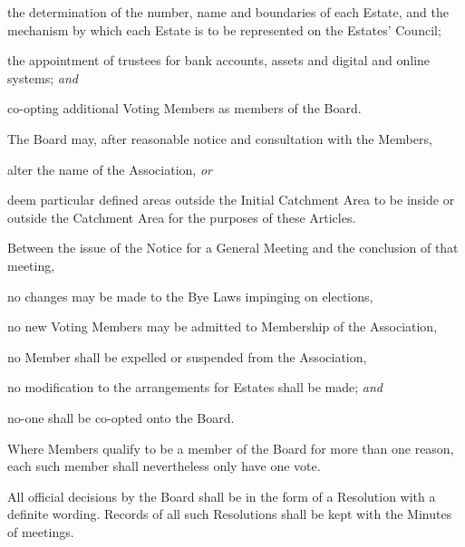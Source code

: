 \documentclass[12pt]{article}
\newcommand{\EC}[0]{Board}
\newcommand{\Exec}[0]{\EC{} }
\newcommand{\ITand}[0]{\textit{and}}
\newcommand{\ITor}[0]{\textit{or}}
\begin{document}
\begin{constenum}
\begin{constenum}
      \item the determination of the number, name
        and boundaries of each Estate, and the mechanism by which each Estate
        is to be represented on the Estates' Council;

      \item the appointment of trustees for bank accounts, assets and
        digital and online systems; \ITand

      \item co-opting additional Voting Members as members of the \EC{}.

    \end{constenum}

  \item The \Exec may, after reasonable notice and consultation with the
    Members,
    \begin{constenum}
    \item alter the name of the Association, \ITor
    \item deem particular defined areas outside the Initial Catchment Area
      to be inside or outside the Catchment Area
      for the purposes of these Articles.
    \end{constenum}

  \item Between the issue of the Notice for a General Meeting and
    the conclusion of that meeting,
    \begin{constenum}
      \item no changes may be made to the Bye Laws impinging on elections,
      \item no new Voting Members may be admitted to Membership of
        the Association,
      \item no Member shall be expelled or suspended from the Association,
      \item no modification to the arrangements for Estates shall be
        made; \ITand
      \item no-one shall be co-opted onto the \EC{}.
    \end{constenum}

  \item Where Members qualify to be a member of the \Exec for more
    than one reason, each such member shall nevertheless only have
    one vote.

  \item All official decisions by the \Exec shall be in the form of a
    Resolution with a definite wording. Records of
    all such Resolutions shall be kept with the
    Minutes of meetings.


\end{constenum}
\end{document}
